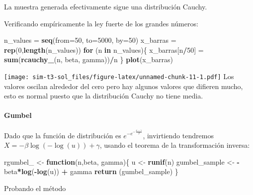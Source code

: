 \documentclass[]{article}
\newenvironment{Shaded}{\begin{snugshade}}{\end{snugshade}}
\newcommand{\ControlFlowTok}[1]{\textcolor[rgb]{0.13,0.29,0.53}{\textbf{#1}}}
\newcommand{\DataTypeTok}[1]{\textcolor[rgb]{0.13,0.29,0.53}{#1}}
\newcommand{\DecValTok}[1]{\textcolor[rgb]{0.00,0.00,0.81}{#1}}
\newcommand{\KeywordTok}[1]{\textcolor[rgb]{0.13,0.29,0.53}{\textbf{#1}}}
\newcommand{\NormalTok}[1]{#1}
\newcommand{\OperatorTok}[1]{\textcolor[rgb]{0.81,0.36,0.00}{\textbf{#1}}}
\newcommand{\StringTok}[1]{\textcolor[rgb]{0.31,0.60,0.02}{#1}}
\let\oldparagraph\paragraph
\renewcommand{\paragraph}[1]{\oldparagraph{#1}\mbox{}}
\begin{document}
La muestra generada efectivamente sigue una distribución Cauchy.

Verificando empíricamente la ley fuerte de los grandes números:

\begin{Shaded}
\begin{Highlighting}[]
\NormalTok{n_values =}\StringTok{ }\KeywordTok{seq}\NormalTok{(}\DataTypeTok{from=}\DecValTok{50}\NormalTok{, }\DataTypeTok{to=}\DecValTok{5000}\NormalTok{, }\DataTypeTok{by=}\DecValTok{50}\NormalTok{)}
\NormalTok{x_barras =}\StringTok{ }\KeywordTok{rep}\NormalTok{(}\DecValTok{0}\NormalTok{,}\KeywordTok{length}\NormalTok{(n_values))}
\ControlFlowTok{for}\NormalTok{ (n }\ControlFlowTok{in}\NormalTok{ n_values)\{}
\NormalTok{  x_barras[n}\OperatorTok{/}\DecValTok{50}\NormalTok{] =}\StringTok{ }\KeywordTok{sum}\NormalTok{(}\KeywordTok{rcauchy_}\NormalTok{(n, beta, gamma))}\OperatorTok{/}\NormalTok{n}
\NormalTok{\}}
\KeywordTok{plot}\NormalTok{(x_barras)}
\end{Highlighting}
\end{Shaded}

\texttt{[image: sim-t3-sol\_files/figure-latex/unnamed-chunk-11-1.pdf]}
Los valores oscilan alrededor del cero pero hay algunos valores que
difieren mucho, esto es normal puesto que la distribución Cauchy no
tiene media.

\hypertarget{gumbel}{%
\paragraph{Gumbel}\label{gumbel}}

Dado que la función de distribución es
\(e^{-e^{-\frac{x-\gamma}{\beta}}}\), invirtiendo tendremos
\(X = -\beta \log(-\log(u)) + \gamma\), usando el teorema de la
transformación inversa:

\begin{Shaded}
\begin{Highlighting}[]
\NormalTok{rgumbel_ <-}\StringTok{ }\ControlFlowTok{function}\NormalTok{(n,beta, gamma)\{}
\NormalTok{  u <-}\StringTok{ }\KeywordTok{runif}\NormalTok{(n)}
\NormalTok{  gumbel_sample <-}\StringTok{ }\OperatorTok{-}\NormalTok{beta}\OperatorTok{*}\KeywordTok{log}\NormalTok{(}\OperatorTok{-}\KeywordTok{log}\NormalTok{(u)) }\OperatorTok{+}\StringTok{ }\NormalTok{gamma}
  \KeywordTok{return}\NormalTok{ (gumbel_sample)}
\NormalTok{\}}
\end{Highlighting}
\end{Shaded}

Probando el método
\end{document}
